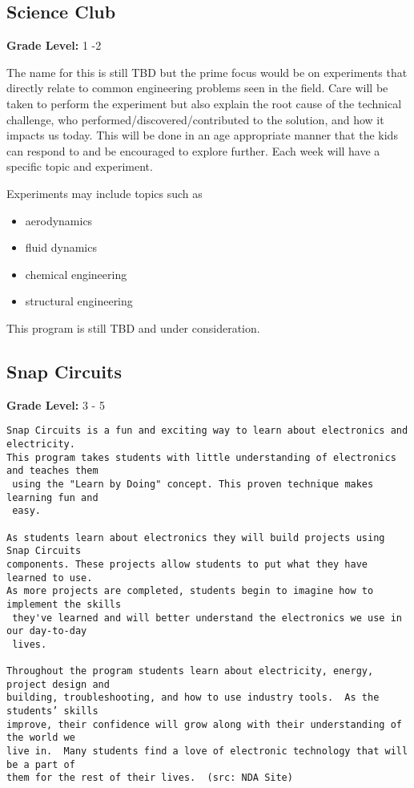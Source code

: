 \documentclass{article}
\begin{document}
\subsection*{Science Club}
\textbf{Grade Level:} 1 -2

The name for this is still TBD but the prime focus would be on experiments that directly relate to common engineering problems seen in the field. Care will be taken to perform the experiment but also explain the root cause of the technical challenge, who performed/discovered/contributed to the solution, and how it impacts us today. This will be done in an age appropriate manner that the kids can respond to and be encouraged to explore further. Each week will have a specific topic and experiment.

Experiments may include topics such as 
\begin{itemize}
    \item aerodynamics
    \item fluid dynamics
    \item chemical engineering
    \item structural engineering
\end{itemize}

This program is still TBD and under consideration.

\subsection*{Snap Circuits}
\textbf{Grade Level:} 3 - 5
\begingroup
    \fontsize{10pt}{12pt}\selectfont
    \begin{verbatim} 
Snap Circuits is a fun and exciting way to learn about electronics and electricity.  
This program takes students with little understanding of electronics and teaches them
 using the "Learn by Doing" concept. This proven technique makes learning fun and 
 easy.

As students learn about electronics they will build projects using Snap Circuits 
components. These projects allow students to put what they have learned to use.  
As more projects are completed, students begin to imagine how to implement the skills
 they've learned and will better understand the electronics we use in our day-to-day
 lives.

Throughout the program students learn about electricity, energy, project design and 
building, troubleshooting, and how to use industry tools.  As the students’ skills 
improve, their confidence will grow along with their understanding of the world we 
live in.  Many students find a love of electronic technology that will be a part of 
them for the rest of their lives.  (src: NDA Site)
\end{verbatim}
\endgroup
\end{document}
